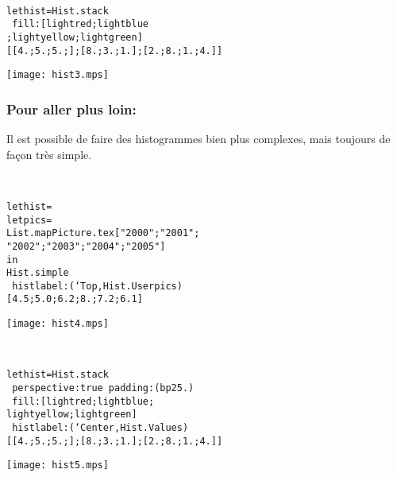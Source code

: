 \documentclass[a4paper,12pt]{article}
\begin{document}
~\\

\begin{minipage}{0.5\linewidth}
  \begin{alltt}
    let hist = Hist.stack 
    ~fill:[lightred;lightblue
      ;lightyellow;lightgreen]
    [[4.;5.;5.;]; [8.;3.;1.]; [2.;8.;1.;4.]]
  \end{alltt}
\end{minipage}
\begin{minipage}{0.5\linewidth}
\begin{center}
\texttt{[image: hist3.mps]}
\end{center}
\end{minipage}

\subsubsection{Pour aller plus loin:}
Il est possible de faire des histogrammes bien plus complexes, mais toujours de façon très simple.

~\\

\begin{minipage}{0.5\linewidth}
  \begin{alltt}
    let hist =
    let pics =
    List.map Picture.tex ["2000";"2001";
      "2002";"2003";"2004";"2005"]
    in
    Hist.simple 
    ~histlabel:(`Top, Hist.User pics)
    [4.5;5.0;6.2;8.;7.2;6.1]
  \end{alltt}
\end{minipage}
\begin{minipage}{0.5\linewidth}
\begin{center}
\texttt{[image: hist4.mps]}
\end{center}
\end{minipage}

~\\

\begin{minipage}{0.5\linewidth}
  \begin{alltt}
    let hist = Hist.stack
    ~perspective:true ~padding:(bp 25.)
    ~fill:[lightred;lightblue;
      lightyellow;lightgreen]
    ~histlabel:(`Center, Hist.Values)
    [[4.;5.;5.;]; [8.;3.;1.]; [2.;8.;1.;4.]]
  \end{alltt}
\end{minipage}
\begin{minipage}{0.5\linewidth}
\begin{center}
\texttt{[image: hist5.mps]}
\end{center}
\end{minipage}
\end{document}
